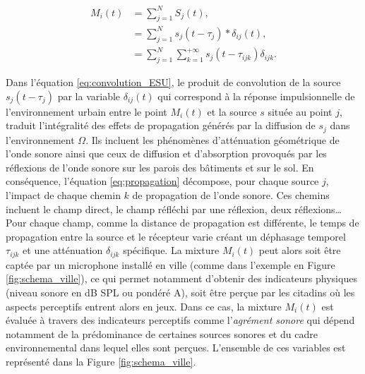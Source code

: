 \begin{subequations}\label{eq:esu_formel}
\begin{align}
M_i(t) &= \sum_{j = 1}^{N}S_j(t), \\
 & = \sum_{j = 1}^{N} s_j(t-\tau_j) \ast \delta_{ij}(t), \label{eq:convolution_ESU}\\
 & = \sum_{j = 1}^{N} \sum_{k = 1}^{+\infty} s_j(t-\tau_{ijk}) \delta_{ijk}.\label{eq:propagation}
\end{align}
\end{subequations}

Dans l'équation \ref{eq:convolution_ESU}, le produit de convolution de la source $s_j(t-\tau_j)$ par la variable $\delta_{ij}(t)$ qui correspond à la réponse impulsionnelle de l'environnement urbain entre le point $M_i(t)$ et la source $s$ située au point $j$, traduit l'intégralité des effets de propagation générés par la diffusion de $s_j$ dans l'environnement $\Omega$. Ils incluent les phénomènes d'atténuation géométrique de l'onde sonore ainsi que ceux de diffusion et d'absorption provoqués par les réflexions de l'onde sonore sur les parois des bâtiments et sur le sol.
En conséquence, l'équation \ref{eq:propagation} décompose, pour chaque source $j$, l'impact de chaque chemin $k$ de propagation de l'onde sonore. Ces chemins incluent le champ direct, le champ réfléchi par une réflexion, deux réflexions\dots{} Pour chaque champ, comme la distance de propagation est différente, le temps de propagation entre la source et le récepteur varie créant un déphasage temporel $\tau_{ijk}$ et une atténuation $\delta_{ijk}$ spécifique.
La mixture $M_{i}(t)$ peut alors soit être captée par un microphone installé en ville (comme dans l'exemple en Figure \ref{fig:schema_ville}), ce qui permet notamment d'obtenir des indicateurs physiques (niveau sonore en dB SPL ou pondéré A), soit être perçue par les citadins où les aspects perceptifs entrent alors en jeux. Dans ce cas, la mixture $M_{i}(t)$ est évaluée à travers des indicateurs perceptifs comme l'\textit{agrément sonore} qui dépend notamment de la prédominance de certaines sources sonores et du cadre environnemental dans lequel elles sont perçues. L'ensemble de ces variables est représenté dans la Figure \ref{fig:schema_ville}.

